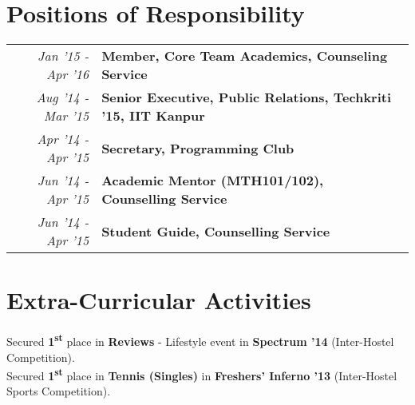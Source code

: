 \documentclass[a4paper]{norm-resume}
\begin{document}
\vspace{1mm}	%


\section{Positions of Responsibility \hrulefill}

\vspace{2mm} %
		
	\begin{tabular}{r|p{16cm}}	

	\null \hspace{10mm} \normalsize\emph{Jan '15 - Apr '16} & \textbf{Member, Core Team Academics, Counseling Service}\\

	\normalsize\emph{Aug '14 - Mar '15} & \textbf{Senior Executive, Public Relations, Techkriti '15, IIT Kanpur}\\

	\normalsize\emph{Apr '14 - Apr '15} & \normalsize\textbf{Secretary, Programming Club}\\

	\normalsize\emph{Jun '14 - Apr '15} & \normalsize\textbf{Academic Mentor (MTH101/102), Counselling Service}\\ 

	\normalsize\emph{Jun '14 - Apr '15} & \normalsize\textbf{Student Guide, Counselling Service}\\

	\end{tabular}

\vspace{2mm}	%

\section{Extra-Curricular Activities \hrulefill}

\vspace{2mm} %
	
	Secured \textbf{1\textsuperscript{st}} place in \textbf{Reviews} - Lifestyle event in \textbf{Spectrum '14} (Inter-Hostel Competition).\\
	Secured \textbf{1\textsuperscript{st}} place in \textbf{Tennis (Singles)} in \textbf{Freshers' Inferno '13} (Inter-Hostel Sports Competition).\\	
\end{document}
